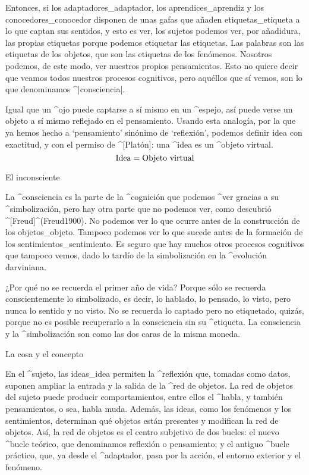 
Entonces, si los adaptadores_{adaptador}, los aprendices_{aprendiz} y
los conocedores_{conocedor} disponen de unas gafas que añaden
etiquetas_{etiqueta} a lo que captan sus sentidos, y esto es ver, los
sujetos podemos ver, por añadidura, las propias etiquetas porque podemos
etiquetar las etiquetas. Las palabras son las etiquetas de los objetos,
que son las etiquetas de los fenómenos. Nosotros podemos, de este modo,
ver nuestros propios pensamientos. Esto no quiere decir que veamos todos
nuestros procesos cognitivos, pero aquéllos que sí vemos, son lo que
denominamos ^|consciencia|.

Igual que un ^{ojo} puede captarse a sí mismo en un ^{espejo}, así puede
verse un objeto a sí mismo reflejado en el pensamiento. Usando esta
analogía, por la que ya hemos hecho a `pensamiento' sinónimo de
`reflexión', podemos definir idea con exactitud, y con el permiso de
^[Platón]: una ^{idea} es un ^{objeto virtual}.
$$\hbox{Idea} = \hbox{Objeto virtual}$$


\Section El inconsciente

La ^{consciencia} es la parte de la ^{cognición} que podemos ^{ver}
gracias a su ^{simbolización}, pero hay otra parte que no podemos ver,
como descubrió ^[Freud]^(Freud1900). No podemos ver lo que ocurre antes
de la construcción de los objetos_{objeto}. Tampoco podemos ver lo que
sucede antes de la formación de los sentimientos_{sentimiento}. Es
seguro que hay muchos otros procesos cognitivos que tampoco vemos, dado
lo tardío de la simbolización en la ^{evolución} darviniana.

¿Por qué no se recuerda el primer año de vida? Porque sólo se recuerda
conscientemente lo simbolizado, es decir, lo hablado, lo pensado, lo
visto, pero nunca lo sentido y no visto. No se recuerda lo captado pero
no etiquetado, quizás, porque no es posible recuperarlo a la consciencia
sin su ^{etiqueta}. La consciencia y la ^{simbolización} son como las
dos caras de la misma moneda.


\Section La cosa y el concepto

En el ^{sujeto}, las ideas_{idea} permiten la ^{reflexión} que, tomadas
como datos, suponen ampliar la entrada y la salida de la ^{red de
objetos}. La red de objetos del sujeto puede producir comportamientos,
entre ellos el ^{habla}, y también pensamientos, o sea, habla muda.
Además, las ideas, como los fenómenos y los sentimientos, determinan qué
objetos están presentes y modifican la red de objetos. Así, la red de
objetos es el centro subjetivo de dos bucles: el nuevo ^{bucle teórico},
que denominamos reflexión o pensamiento; y el antiguo ^{bucle práctico},
que, ya desde el ^{adaptador}, pasa por la acción, el entorno exterior y
el fenómeno.

